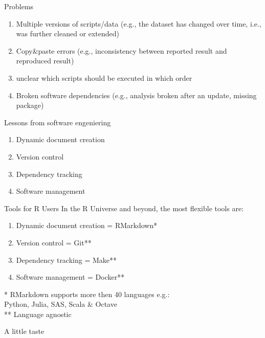 \documentclass[12pt,t]{beamer}
\begin{document}
{\begin{frame}[c]{Problems}
  \begin{enumerate}
    \item<1->Multiple versions of scripts/data (e.g., the dataset has changed over time, i.e., was further cleaned or extended)
    \item<2->Copy\&paste errors (e.g., inconsistency between reported result and reproduced result)
    \item<3->\textcolor<5>{hilit}{unclear which scripts should be executed in which order}
    \item<4->\textcolor<5>{vhilit}{Broken software dependencies (e.g., analysis broken after an update, missing package)}
  \end{enumerate}
\end{frame}

\begin{frame}[c]{Lessons from software engeniering}
  \begin{enumerate}
    \item Dynamic document creation
    \item Version control
    \item \textcolor<2>{hilit}{Dependency tracking}
    \item \textcolor<2>{vhilit}{Software management}
  \end{enumerate}
  \vfill
\end{frame}

\begin{frame}[c]{Tools for R Users}
  In the R Universe and beyond, the most flexible tools are:
  \begin{enumerate}
    \item Dynamic document creation = RMarkdown*
    \item Version control = Git**
    \item \textcolor{hilit}{Dependency tracking = Make**}
    \item \textcolor{vhilit}{Software management = Docker**}
  \end{enumerate}
  \vfill
  \textcolor{lolit}{
	* RMarkdown supports more then 40 languages e.g.:\\
	\hspace{10mm}Python, Julia, SAS, Scala \& Octave\\
	** Language agnostic
	}
\end{frame}

\begin{frame}[c, fragile]{A little taste}


\end{frame}}
\end{document}
